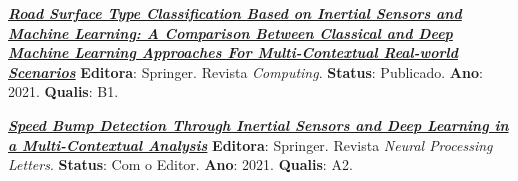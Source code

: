 \begin{small}
\begin{description}
    \item \textbf{\textit{\href{https://link.springer.com/article/10.1007/s00607-021-00914-0}{Road Surface Type Classification Based on Inertial Sensors and Machine Learning: A Comparison Between Classical and Deep Machine Learning Approaches For Multi-Contextual Real-world Scenarios}}} \phantom{ } 
    \newline\textbf{Editora}: Springer. Revista \textit{Computing}.  
    \newline\textbf{Status}: Publicado.
    \newline\textbf{Ano}: 2021.
    \newline\textbf{Qualis}: B1.
    
    \item \textbf{\textit{\href{}{Speed Bump Detection Through Inertial Sensors and Deep Learning in a Multi-Contextual Analysis}}}\phantom{ } 
    \newline\textbf{Editora}: Springer. Revista \textit{Neural Processing Letters}.  
    \newline\textbf{Status}: Com o Editor.
    \newline\textbf{Ano}: 2021.
    \newline\textbf{Qualis}: A2.

\end{description}
\end{small}